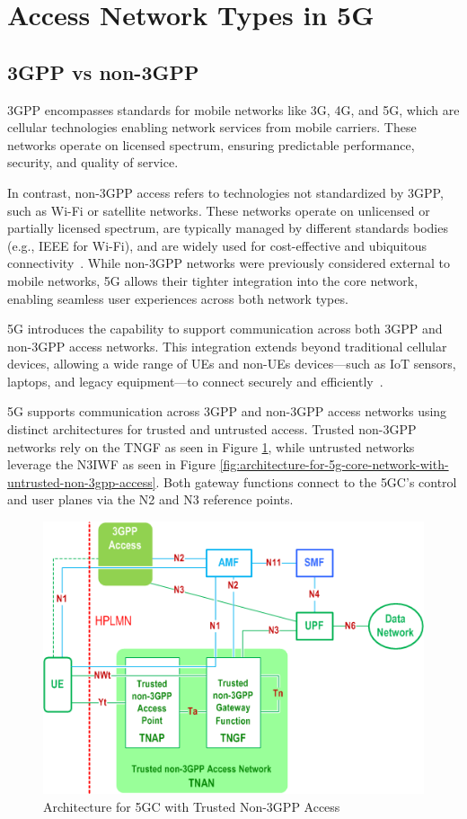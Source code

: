 \section{Access Network Types in \acs{5G}}

\subsection{\acs{3GPP} vs non-\acs{3GPP}}
\ac{3GPP} encompasses standards for mobile networks like \ac{3G}, \ac{4G}, and \ac{5G}, which are cellular technologies enabling network services from mobile carriers. These networks operate on licensed spectrum, ensuring predictable performance, security, and quality of service.

In contrast, non-\ac{3GPP} access refers to technologies not standardized by \ac{3GPP}, such as Wi-Fi or satellite networks. These networks operate on unlicensed or partially licensed spectrum, are typically managed by different standards bodies (e.g., IEEE for Wi-Fi), and are widely used for cost-effective and ubiquitous connectivity~\cite{wba-04-2023-p3}. While non-\ac{3GPP} networks were previously considered external to mobile networks, \ac{5G} allows their tighter integration into the core network, enabling seamless user experiences across both network types.

\ac{5G} introduces the capability to support communication across both \ac{3GPP} and non-\ac{3GPP} access networks. This integration extends beyond traditional cellular devices, allowing a wide range of \acp{UE} and non-\acp{UE} devices—such as \ac{IoT} sensors, laptops, and legacy equipment—to connect securely and efficiently~\cite{23.501-p57}.

\ac{5G} supports communication across \ac{3GPP} and non-\ac{3GPP} access networks using distinct architectures for trusted and untrusted access. Trusted non-\ac{3GPP} networks rely on the \ac{TNGF} as seen in Figure \ref{fig:architecture-for-5g-core-network-with-trusted-non-3gpp-access}, while untrusted networks leverage the \ac{N3IWF} as seen in Figure \ref{fig:architecture-for-5g-core-network-with-untrusted-non-3gpp-access}. Both gateway functions connect to the \ac{5GC}’s control and user planes via the N2 and N3 reference points.

\begin{figure}
    \centering
    \includegraphics[width=0.5\linewidth]{figs/architecture-for-5g-core-network-with-trusted-non-3gpp-access.png}
    \caption{Architecture for \ac{5GC} with Trusted Non-\acs{3GPP} Access}
    \label{fig:architecture-for-5g-core-network-with-trusted-non-3gpp-access}
\end{figure}

